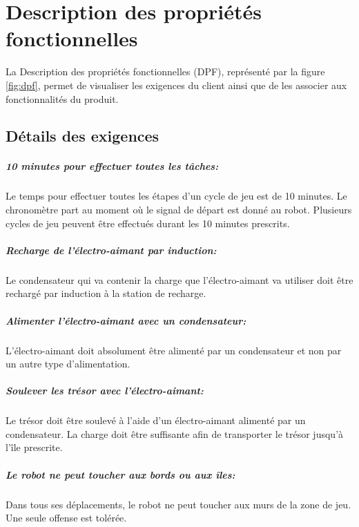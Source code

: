\chapter{Description des propriétés fonctionnelles}
La Description des propriétés fonctionnelles (DPF), représenté par la figure \ref{fig:dpf}, permet de visualiser les exigences du client ainsi que de les associer aux fonctionnalités du produit.

\section{Détails des exigences}

\paragraph{10 minutes pour effectuer toutes les tâches:}
Le temps pour effectuer toutes les étapes d'un cycle de jeu est de 10 minutes. Le chronomètre part au moment où le signal de départ est donné au robot.
Plusieurs cycles de jeu peuvent être effectués durant les 10 minutes prescrits.

\paragraph{Recharge de l'électro-aimant par induction:}
Le condensateur qui va contenir la charge que l'électro-aimant va utiliser doit être rechargé par induction à la station de recharge.

\paragraph{Alimenter l'électro-aimant avec un condensateur:}
L'électro-aimant doit absolument être alimenté par un condensateur et non par un autre type d'alimentation.

\paragraph{Soulever les trésor avec l'électro-aimant:}
Le trésor doit être soulevé à l'aide d'un électro-aimant alimenté par un condensateur. La charge doit être suffisante afin de transporter le trésor jusqu'à l'île prescrite.

\paragraph{Le robot ne peut toucher aux bords ou aux îles:}
Dans tous ses déplacements, le robot ne peut toucher aux murs de la zone de jeu. Une seule offense est tolérée.

